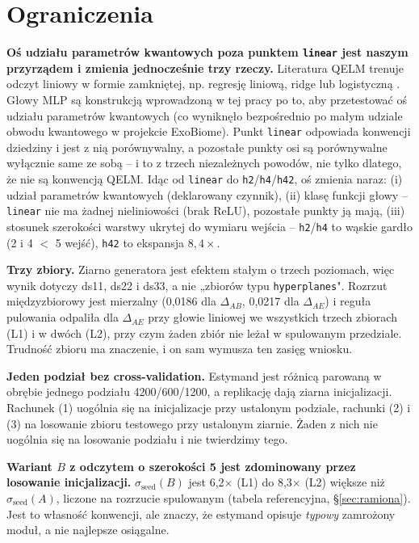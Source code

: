 \documentclass[11pt, a4paper]{article}
\begin{document}
\section{Ograniczenia}\label{sec:ograniczenia}

\textbf{Oś udziału parametrów kwantowych poza punktem \texttt{linear} jest naszym przyrządem i zmienia jednocześnie trzy rzeczy.} Literatura QELM trenuje odczyt liniowy w formie zamkniętej, np. regresję liniową, ridge lub logistyczną \citep{xiong2023, mujal2021}. Głowy MLP są konstrukcją wprowadzoną w tej pracy po to, aby przetestować oś udziału parametrów kwantowych (co wyniknęło bezpośrednio po małym udziale obwodu kwantowego w projekcie ExoBiome). Punkt \texttt{linear} odpowiada konwencji dziedziny i jest z nią porównywalny, a pozostałe punkty osi są porównywalne wyłącznie same ze sobą -- i to z trzech niezależnych powodów, nie tylko dlatego, że nie są konwencją QELM. Idąc od \texttt{linear} do \texttt{h2}/\texttt{h4}/\texttt{h42}, oś zmienia naraz: (i) udział parametrów kwantowych (deklarowany czynnik), (ii) klasę funkcji głowy -- \texttt{linear} nie ma żadnej nieliniowości (brak ReLU), pozostałe punkty ją mają, (iii) stosunek szerokości warstwy ukrytej do wymiaru wejścia -- \texttt{h2}/\texttt{h4} to wąskie gardło (2 i 4 $<$ 5 wejść), \texttt{h42} to ekspansja $8{,}4\times$. 

\textbf{Trzy zbiory.} Ziarno generatora jest efektem stałym o trzech poziomach, więc wynik dotyczy ds11, ds22 i ds33, a nie „zbiorów typu \texttt{hyperplanes}". Rozrzut międzyzbiorowy jest mierzalny (0,0186 dla $\Delta_{AB}$, 0,0217 dla $\Delta_{AE}$) i reguła pulowania odpaliła dla $\Delta_{AE}$ przy głowie liniowej we wszystkich trzech zbiorach (L1) i w dwóch (L2), przy czym żaden zbiór nie leżał w spulowanym przedziale. Trudność zbioru ma znaczenie, i on sam wymusza ten zasięg wniosku.

\textbf{Jeden podział bez cross-validation.} Estymand jest różnicą parowaną w obrębie jednego podziału 4200/600/1200, a replikację dają ziarna inicjalizacji. Rachunek (1) uogólnia się na inicjalizacje przy ustalonym podziale, rachunki (2) i (3) na losowanie zbioru testowego przy ustalonym ziarnie. Żaden z nich nie uogólnia się na losowanie podziału i nie twierdzimy tego.

\textbf{Wariant $B$ z odczytem o szerokości 5 jest zdominowany przez losowanie inicjalizacji.} $\sigma_{\text{seed}}(B)$ jest 6,2$\times$ (L1) do 8,3$\times$ (L2) większe niż $\sigma_{\text{seed}}(A)$, liczone na rozrzucie spulowanym (tabela referencyjna, \S\ref{sec:ramiona}). Jest to własność konwencji, ale znaczy, że estymand opisuje \emph{typowy} zamrożony moduł, a nie najlepsze osiągalne.
\end{document}
